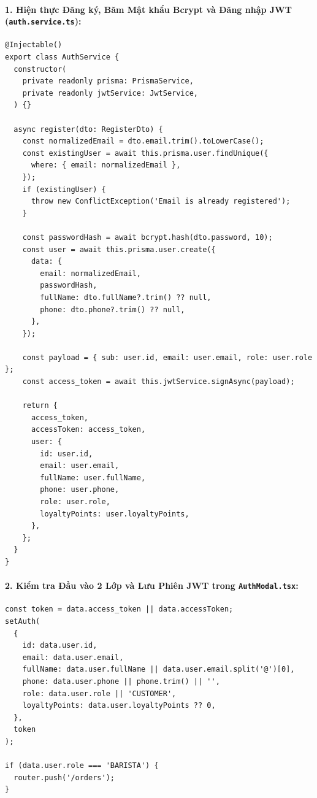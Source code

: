 \documentclass[a4paper]{article}
\begin{document}
\paragraph{1. Hiện thực Đăng ký, Băm Mật khẩu Bcrypt và Đăng nhập JWT (\texttt{auth.service.ts}):}
\begin{lstlisting}[caption={Hiện thực đăng ký, băm mật khẩu Bcrypt và đăng nhập JWT tại AuthService}]
@Injectable()
export class AuthService {
  constructor(
    private readonly prisma: PrismaService,
    private readonly jwtService: JwtService,
  ) {}

  async register(dto: RegisterDto) {
    const normalizedEmail = dto.email.trim().toLowerCase();
    const existingUser = await this.prisma.user.findUnique({
      where: { email: normalizedEmail },
    });
    if (existingUser) {
      throw new ConflictException('Email is already registered');
    }

    const passwordHash = await bcrypt.hash(dto.password, 10);
    const user = await this.prisma.user.create({
      data: {
        email: normalizedEmail,
        passwordHash,
        fullName: dto.fullName?.trim() ?? null,
        phone: dto.phone?.trim() ?? null,
      },
    });

    const payload = { sub: user.id, email: user.email, role: user.role };
    const access_token = await this.jwtService.signAsync(payload);

    return {
      access_token,
      accessToken: access_token,
      user: {
        id: user.id,
        email: user.email,
        fullName: user.fullName,
        phone: user.phone,
        role: user.role,
        loyaltyPoints: user.loyaltyPoints,
      },
    };
  }
}
\end{lstlisting}

\paragraph{2. Kiểm tra Đầu vào 2 Lớp và Lưu Phiên JWT trong \texttt{AuthModal.tsx}:}
\begin{lstlisting}[caption={Kiểm tra định dạng SĐT 10 chữ số và lưu phiên JWT trong AuthModal.tsx}]
const token = data.access_token || data.accessToken;
setAuth(
  {
    id: data.user.id,
    email: data.user.email,
    fullName: data.user.fullName || data.user.email.split('@')[0],
    phone: data.user.phone || phone.trim() || '',
    role: data.user.role || 'CUSTOMER',
    loyaltyPoints: data.user.loyaltyPoints ?? 0,
  },
  token
);

if (data.user.role === 'BARISTA') {
  router.push('/orders');
}
\end{lstlisting}
\end{document}
